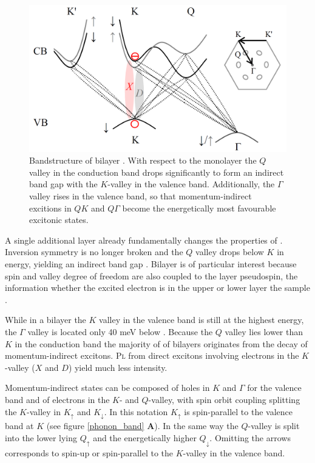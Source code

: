 \begin{figure}[t]
\centering
\includegraphics[width=.75\textwidth]{bilayerbands}
\caption{Bandstructure of bilayer \wse\!  \cite{lindlau_role_2017}. With respect to the monolayer the $Q$ valley in the conduction band drops significantly to form an indirect band gap with the $K$-valley in the valence band. Additionally, the $\Gamma$ valley rises in the valence band, so that momentum-indirect excitions in $QK$ and $Q\Gamma$ become the energetically most favourable excitonic states.}
\label{bandgap}

\end{figure}

A single additional layer already fundamentally changes the properties of \wse\!. Inversion symmetry is no longer broken and the $Q$ valley drops below $K$ in energy, yielding an indirect band gap \cite{zibouche_transition-metal_2014_2}. Bilayer \wse is of particular interest because spin and valley degree of freedom are also coupled to the layer pseudospin, the information whether the excited electron is in the upper or lower layer the sample \cite{jones_spin-layer_2014}. 

While in a bilayer the $K$ valley in the valence band is still at the highest energy, the $\Gamma$ valley is located only 40 meV below \cite{wilson_determination_2017}. Because the $Q$ valley lies lower than $K$ in the conduction band the majority of \pl of \wse bilayers originates from the decay of momentum-indirect excitons. \textsc{Pl} from direct excitons involving electrons in the $K$-valley ($X$ and $D$) yield much less intensity.

Momentum-indirect states can be composed of holes in $K$ and $\Gamma$ for the valence band and of electrons in the $K$- and $Q$-valley, with spin orbit coupling splitting the $K$-valley in $K_\uparrow$ and $K_\downarrow$. In this notation $K_\uparrow$ is spin-parallel to the valence band at $K$ (see figure \ref{phonon_band} \textbf{A}). In the same way the $Q$-valley is split into the lower lying $Q_\uparrow$ and the energetically higher $Q_\downarrow$. Omitting the arrows corresponds to spin-up or spin-parallel to the $K$-valley in the valence band.

